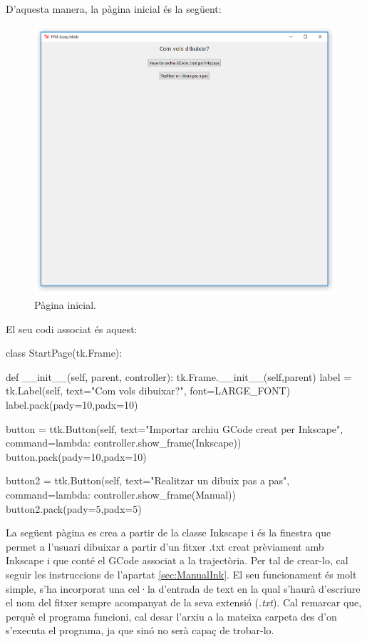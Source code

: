 D’aquesta manera, la pàgina inicial és la següent:

\begin{figure}[H]
	\centering
	\includegraphics[scale=0.9]{StartPage}
	\caption{Pàgina inicial.}
	\label{fig:StartPage}
\end{figure}

El seu codi associat és aquest:

\begin{python}
	class StartPage(tk.Frame):
	
	def __init__(self, parent, controller):
	tk.Frame.__init__(self,parent)
	label = tk.Label(self, text="Com vols dibuixar?", font=LARGE_FONT)
	label.pack(pady=10,padx=10)
	
	button = ttk.Button(self, text="Importar archiu GCode creat per Inkscape",
	command=lambda: controller.show_frame(Inkscape))
	button.pack(pady=10,padx=10)
	
	button2 = ttk.Button(self, text="Realitzar un dibuix pas a pas",
	command=lambda: controller.show_frame(Manual))
	button2.pack(pady=5,padx=5)
\end{python}

La següent pàgina es crea a partir de la classe Inkscape i és la finestra que permet a l’usuari dibuixar a partir d’un fitxer .txt creat prèviament amb Inkscape i que conté el GCode associat a la trajectòria. Per tal de crear-lo, cal seguir les instruccions de l’apartat \ref{sec:ManualInk}. El seu funcionament és molt simple, s’ha incorporat una cel·la d’entrada de text en la qual s’haurà d’escriure el nom del fitxer sempre acompanyat de la seva extensió (\emph{.txt}). Cal remarcar que, perquè el programa funcioni, cal desar l’arxiu a la mateixa carpeta des d’on s’executa el programa, ja que sinó no serà capaç de trobar-lo.

